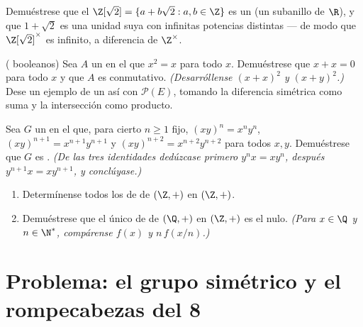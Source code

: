 \begin{exercise}[$\star\star$]\label{exo:b1:structures:9}
Demuéstrese que el  $\Z[\sqrt 2] = \{a + b\sqrt 2 : a, b \in \Z\}$
es un  (un subanillo de $\R$), y que $1 + \sqrt 2$ es una unidad
suya con infinitas potencias distintas --- de modo que
$\Z[\sqrt 2]^\times$ es infinito, a diferencia de $\Z^\times$.
\end{exercise}

\begin{exercise}[$\star\star\star$]\label{exo:b1:structures:10}
( booleanos) Sea $A$ un  en el que $x^2 = x$ para todo
$x$. Demuéstrese que $x + x = 0$ para todo $x$ y que $A$ es conmutativo.
\emph{(Desarróllense $(x+x)^2$ y $(x+y)^2$.)} Dese un ejemplo de un
 así con $\mathcal{P}(E)$, tomando la diferencia simétrica como
suma y la intersección como producto.
\end{exercise}

\begin{exercise}[$\star\star\star$]\label{exo:b1:structures:11}
Sea $G$ un  en el que, para cierto $n \geq 1$ fijo,
$(xy)^n = x^n y^n$, $(xy)^{n+1} = x^{n+1}y^{n+1}$ y
$(xy)^{n+2} = x^{n+2}y^{n+2}$ para todos $x, y$. Demuéstrese que $G$ es
. \emph{(De las tres identidades dedúzcase primero
$y^n x = x y^n$, después $y^{n+1} x = x y^{n+1}$, y conclúyase.)}
\end{exercise}

\begin{exercise}[$\star\star$]\label{exo:b1:structures:12}
\begin{enumerate}
  \item Determínense todos los  de  de $(\Z, +)$ en $(\Z, +)$.
  \item Demuéstrese que el único  de  de $(\Q, +)$ en
        $(\Z, +)$ es el  nulo. \emph{(Para $x \in \Q$ y
        $n \in \N^*$, compárense $f(x)$ y $n\,f(x/n)$.)}
\end{enumerate}
\end{exercise}

\section{Problema: el grupo simétrico y el rompecabezas del 8}

